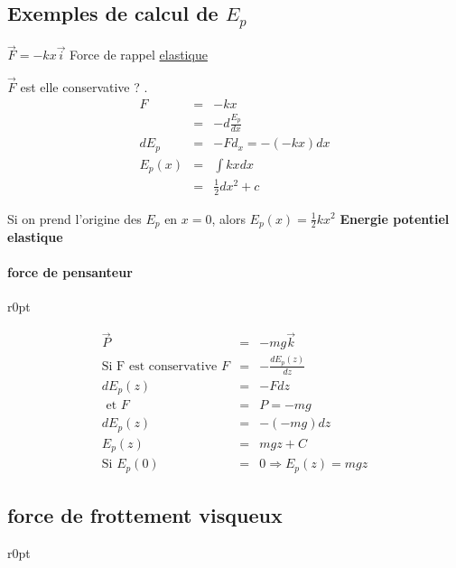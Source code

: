 \subsection{Exemples de calcul de $E_p$}

$\vec{F} =-kx\vec{i}$ Force de rappel \ul{elastique}

$\vec{F}$ est elle conservative ? .
\[\begin{array}{rcl}
F &=& -kx \\
&=& -d\frac{E_p}{dx} \\
	dE_p &=& -Fd_x = -(-kx)dx \\
E_p(x) &=& \int kxdx \\
&=& \frac{1}{2}dx^2 + c\end{array}\]

Si on prend l'origine des $E_p$ en $x=0$, alors $E_p(x) = \frac{1}{2}kx^2$ \textbf{Energie potentiel elastique}

\paragraph{force de pensanteur}

\begin{wrapfigure}[6]{r}{0pt}
\end{wrapfigure}

\[\begin{array}{rcl}
\vec{P} &=& -mg\vec{k} \\
\text{Si F est conservative } F &=& -\frac{dE_p(z)}{dz} \\
dE_p(z) &=& -Fdz \\
\text{ et } F &=& P = -mg \\
dE_p(z) &=& -(-mg)dz \\
E_p(z) &=& mgz + C \\
\text{Si } E_p(0) &=& 0 \Rightarrow E_p(z) = mgz\end{array}\]

\subsection{force de frottement visqueux}

\begin{wrapfigure}[5]{r}{0pt}

\end{wrapfigure}

